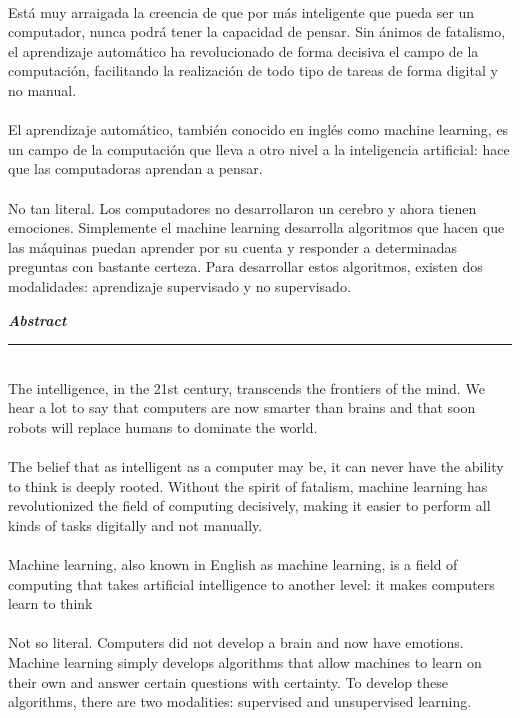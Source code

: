 \documentclass[11pt,a4paper]{article}
\begin{document}
        \\Está muy arraigada la creencia de que por más inteligente que pueda ser un computador, nunca podrá tener la capacidad de pensar. Sin ánimos de fatalismo, el aprendizaje automático ha revolucionado de forma decisiva el campo de la computación, facilitando la realización de todo tipo de tareas de forma digital y no manual.\\ 
        
        \\El aprendizaje automático, también conocido en inglés como machine learning, es un campo de la computación que lleva a otro nivel a la inteligencia artificial: hace que las computadoras aprendan a pensar.\\
        
        \\No tan literal. Los computadores no desarrollaron un cerebro y ahora tienen emociones. Simplemente el machine learning desarrolla algoritmos que hacen que las máquinas puedan aprender por su cuenta y responder a determinadas preguntas con bastante certeza. Para desarrollar estos algoritmos, existen dos modalidades: aprendizaje supervisado y no supervisado.\\
		
		\newpage
		
		\textbf{\textit{\large Abstract}}\rule[1.5mm]{5mm}{0.1mm} 		
		\textit{	
		 }\vspace{\baselineskip}
		 \\The intelligence, in the 21st century, transcends the frontiers of the mind. We hear a lot to say that computers are now smarter than brains and that soon robots will replace humans to dominate the world.\\
		 
		 \\The belief that as intelligent as a computer may be, it can never have the ability to think is deeply rooted. Without the spirit of fatalism, machine learning has revolutionized the field of computing decisively, making it easier to perform all kinds of tasks digitally and not manually.\\
		 
		 \\Machine learning, also known in English as machine learning, is a field of computing that takes artificial intelligence to another level: it makes computers learn to think\\
		 
		 \\Not so literal. Computers did not develop a brain and now have emotions. Machine learning simply develops algorithms that allow machines to learn on their own and answer certain questions with certainty. To develop these algorithms, there are two modalities: supervised and unsupervised learning.\\
				
\end{document}
